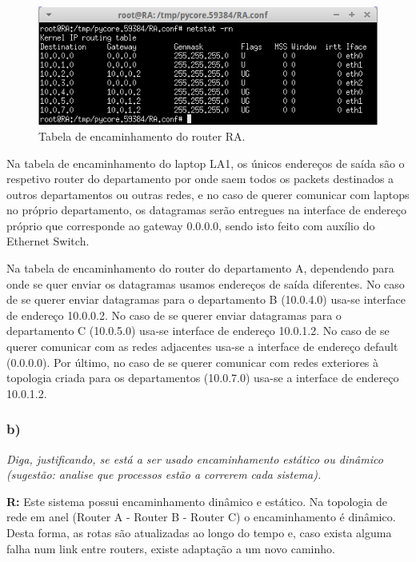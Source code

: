 \documentclass{llncs}
\begin{document}
\begin{figure}[H]
\begin{center}
\includegraphics[scale=0.60]{netstat_RA.png} 
\end{center}
\caption{\label{fig:netstat_ra} Tabela de encaminhamento do router RA.}
\end{figure} 

Na tabela de encaminhamento do laptop LA1, os únicos endereços de saída são o respetivo router do departamento por onde saem todos os packets destinados a outros departamentos ou outras redes, e no caso de querer comunicar com laptops no próprio departamento, os datagramas serão entregues na interface de endereço próprio que corresponde ao gateway 0.0.0.0, sendo isto feito com auxílio do Ethernet Switch.

Na tabela de encaminhamento do router do departamento A, dependendo para onde se quer enviar os datagramas usamos endereços de saída diferentes. No caso de se querer enviar datagramas para o departamento B (10.0.4.0) usa-se interface de endereço 10.0.0.2. No caso de se querer enviar datagramas para o departamento C (10.0.5.0) usa-se interface de endereço 10.0.1.2. No caso de se querer comunicar com as redes adjacentes usa-se a interface de endereço default (0.0.0.0). Por último, no caso de se querer comunicar com redes exteriores à topologia criada para os departamentos (10.0.7.0) usa-se a interface de endereço 10.0.1.2. 

\subsubsection{b)}
\emph{Diga,  justificando, se  está  a  ser  usado  encaminhamento  estático  ou dinâmico (sugestão: analise  que  processos  estão  a  correrem cada sistema).}
\\ \par
\textbf{R:} Este sistema possui encaminhamento dinâmico e estático. Na topologia de rede em anel (Router A - Router B - Router C) o encaminhamento é dinâmico. Desta forma, as rotas são atualizadas ao longo do tempo e, caso exista alguma falha num link entre routers, existe adaptação a um novo caminho.
\end{document}
